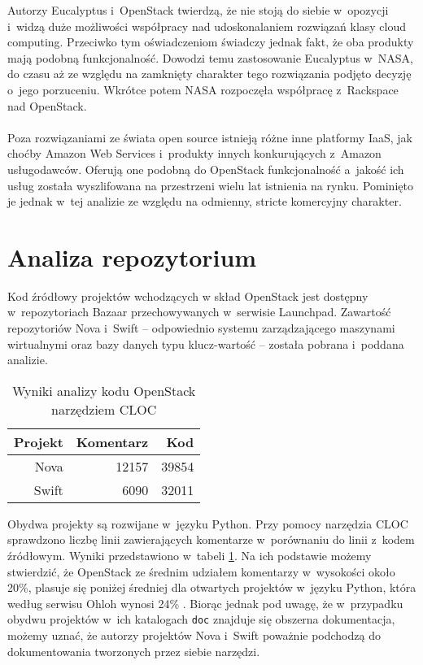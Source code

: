 	Autorzy Eucalyptus i~OpenStack twierdzą, że nie stoją do siebie w~opozycji
	i~widzą duże możliwości współpracy nad udoskonalaniem rozwiązań klasy cloud
	computing. Przeciwko tym oświadczeniom świadczy jednak fakt, że oba produkty
	mają podobną funkcjonalność. Dowodzi temu zastosowanie Eucalyptus w~NASA, do
	czasu aż ze względu na zamknięty charakter tego rozwiązania podjęto decyzję
	o~jego porzuceniu. Wkrótce potem NASA rozpoczęła współpracę z~Rackspace nad
	OpenStack.

	\paragraph{}

	Poza rozwiązaniami ze świata open source istnieją różne inne platformy IaaS,
	jak choćby Amazon Web Services i~produkty innych konkurujących z~Amazon
	usługodawców. Oferują one podobną do OpenStack funkcjonalność a~jakość ich
	usług została wyszlifowana na przestrzeni wielu lat istnienia na rynku.
	Pominięto je jednak w~tej analizie ze względu na odmienny, stricte
	komercyjny charakter.

	\section{Analiza repozytorium}

	Kod źródłowy projektów wchodzących w skład OpenStack jest dostępny
	w~repozytoriach Bazaar przechowywanych w~serwisie Launchpad. Zawartość
	repozytoriów Nova i~Swift -- odpowiednio systemu zarządzającego maszynami
	wirtualnymi oraz bazy danych typu klucz-wartość -- została pobrana i~poddana
	analizie.

	\begin{table}
		\centering
		\begin{tabular}{|r|r|r|}
			\hline
			\bf Projekt & \bf Komentarz & \phantom{asdf} \bf Kod \\
			\hline
			Nova & 12157 & 39854 \\
			Swift & 6090 & 32011 \\
			\hline
		\end{tabular}
		\caption{Wyniki analizy kodu OpenStack narzędziem CLOC}
		\label{tab:cloc}
	\end{table}

	Obydwa projekty są rozwijane w~języku Python. Przy pomocy narzędzia CLOC
	\cite{cloc} sprawdzono liczbę linii zawierających komentarze w~porównaniu do
	linii z~kodem źródłowym. Wyniki przedstawiono w~tabeli \ref{tab:cloc}.
	Na ich podstawie możemy stwierdzić, że OpenStack ze średnim udziałem
	komentarzy w~wysokości około 20\%, plasuje się poniżej średniej dla
	otwartych projektów w~języku Python, która według serwisu Ohloh wynosi 24\%
	\cite{ohloh_python_stats}. Biorąc jednak pod uwagę, że w~przypadku obydwu
	projektów w~ich katalogach \texttt{doc} znajduje się obszerna dokumentacja,
	możemy uznać, że autorzy projektów Nova i~Swift poważnie podchodzą do
	dokumentowania tworzonych przez siebie narzędzi.

